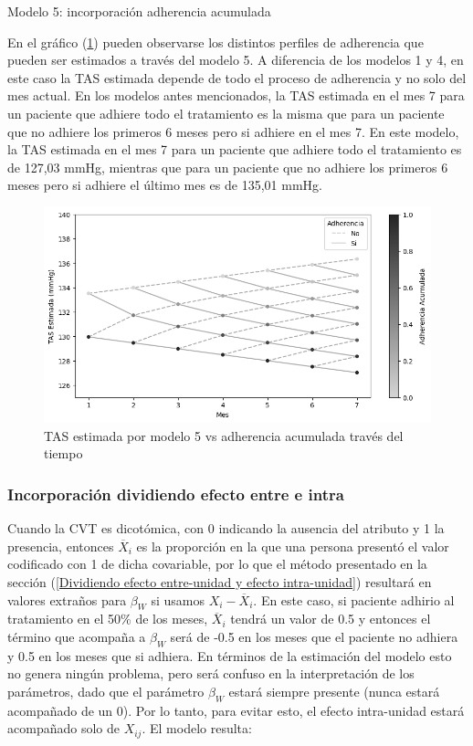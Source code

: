 \documentclass[spanish]{article}
\numberwithin{figure}{subsection}
\numberwithin{equation}{subsection}
\numberwithin{table}{subsection}
\begin{document}
\begin{table}[H]
	\centering
	\caption{Modelo 5: incorporación adherencia acumulada}
	\label{modelo_5_tabla}
	
\end{table}

En el gráfico (\ref{modelo_5_plot}) pueden observarse los distintos perfiles de
adherencia que pueden ser estimados a través del modelo 5. A diferencia de los
modelos 1 y 4, en este caso la TAS estimada depende de todo el proceso de
adherencia y no solo del mes actual. En los modelos antes mencionados, la TAS
estimada en el mes 7 para un paciente que adhiere todo el tratamiento es la
misma que para un paciente que no adhiere los primeros 6 meses pero si adhiere
en el mes 7. En este modelo, la TAS estimada en el mes 7 para un paciente que
adhiere todo el tratamiento es de 127,03 mmHg, mientras que para un paciente que
no adhiere los primeros 6 meses pero si adhiere el último mes es de 135,01 mmHg.

\begin{figure}[H]
	\centering
	\includegraphics[scale=0.5]{img/modelo_5.png}
	\caption{TAS estimada por modelo 5 vs adherencia acumulada través del tiempo}
	\label{modelo_5_plot}
\end{figure}

\subsubsection{Incorporación dividiendo efecto entre e intra}

Cuando la CVT es dicotómica, con 0 indicando la ausencia del atributo y 1 la
presencia, entonces $\overline{X}_i$ es la proporción en la que una persona
presentó el valor codificado con 1 de dicha covariable, por lo que el método
presentado en la sección (\ref{Dividiendo efecto entre-unidad y efecto
intra-unidad}) resultará en valores extraños para $\beta_W$ si usamos $X_i -
\overline{X}_i$. En este caso, si paciente adhirio al tratamiento en el 50\% de
los meses, $\overline{X}_i$ tendrá un valor de 0.5 y entonces el término que
acompaña a $\beta_W$ será de -0.5 en los meses que el paciente no adhiera y 0.5
en los meses que si adhiera. En términos de la estimación del modelo esto no
genera ningún problema, pero será confuso en la interpretación de los
parámetros, dado que el parámetro $\beta_W$ estará siempre presente (nunca
estará acompañado de un 0). Por lo tanto, para evitar esto, el efecto
intra-unidad estará acompañado solo de $X_{ij}$. El modelo resulta:
\end{document}
